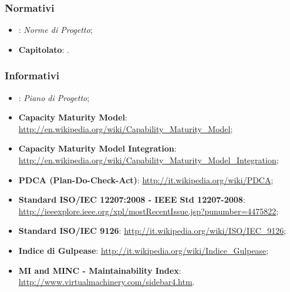 \subsubsection{Normativi}
\begin{itemize}
\item \textbf{\NdP}: \textit{Norme di Progetto};
\item \textbf{Capitolato}: .
\end{itemize}

\subsubsection{Informativi}
\begin{itemize}
\item \textbf{\PdP}: \textit{Piano di Progetto};
\item \textbf{Capacity Maturity Model}: \url{http://en.wikipedia.org/wiki/Capability_Maturity_Model};
\item \textbf{Capacity Maturity Model Integration}: \url{http://en.wikipedia.org/wiki/Capability_Maturity_Model_Integration};
\item \textbf{PDCA (Plan-Do-Check-Act)}: \url{http://it.wikipedia.org/wiki/PDCA};
\item \textbf{Standard ISO/IEC 12207:2008 - IEEE Std 12207-2008}: \url{http://ieeexplore.ieee.org/xpl/mostRecentIssue.jsp?punumber=4475822};
\item \textbf{Standard ISO/IEC 9126}: \url{http://it.wikipedia.org/wiki/ISO/IEC_9126};
\item \textbf{Indice di Gulpease}: \url{http://it.wikipedia.org/wiki/Indice_Gulpease};
\item \textbf{MI and MINC - Maintainability Index}: \url{http://www.virtualmachinery.com/sidebar4.htm}.
\end{itemize}
